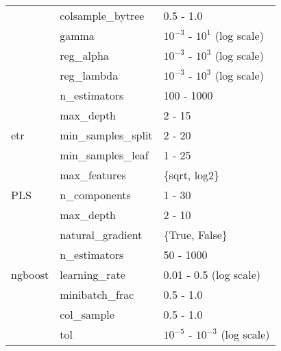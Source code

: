 \begin{table*}
\begin{tabular}{@{}l>{\ttfamily}lp{}@{}}
                               & colsample\_bytree           & 0.5 - 1.0                                 \\ \cmidrule{2-3}
                               & gamma                       & $10^{-3}$ - $10^{1}$ (log scale)          \\ \cmidrule{2-3}
                               & reg\_alpha                  & $10^{-3}$ - $10^{3}$ (log scale)          \\ \cmidrule{2-3}
                               & reg\_lambda                 & $10^{-3}$ - $10^{3}$ (log scale)          \\ \midrule
\multirow{5}{*}{\gls{etr}}     & n\_estimators               & 100 - 1000                                \\ \cmidrule{2-3}
                               & max\_depth                  & 2 - 15                                    \\ \cmidrule{2-3}
                               & min\_samples\_split         & 2 - 20                                    \\ \cmidrule{2-3}
                               & min\_samples\_leaf          & 1 - 25                                    \\ \cmidrule{2-3}
                               & max\_features               & \{sqrt, log2\}                            \\ \midrule
PLS                            & n\_components               & 1 - 30                                    \\ \midrule
\multirow{8}{*}{\gls{ngboost}} & max\_depth                  & 2 - 10                                    \\ \cmidrule{2-3}
                               & natural\_gradient           & \{True, False\}                           \\ \cmidrule{2-3}
                               & n\_estimators               & 50 - 1000                                 \\ \cmidrule{2-3}
                               & learning\_rate              & 0.01 - 0.5 (log scale)                    \\ \cmidrule{2-3}
                               & minibatch\_frac             & 0.5 - 1.0                                 \\ \cmidrule{2-3}
                               & col\_sample                 & 0.5 - 1.0                                 \\ \cmidrule{2-3}
                               & tol                         & $10^{-5}$ - $10^{-3}$ (log scale)         \\ \cmidrule{2-3}

\end{tabular}
\end{table*}
